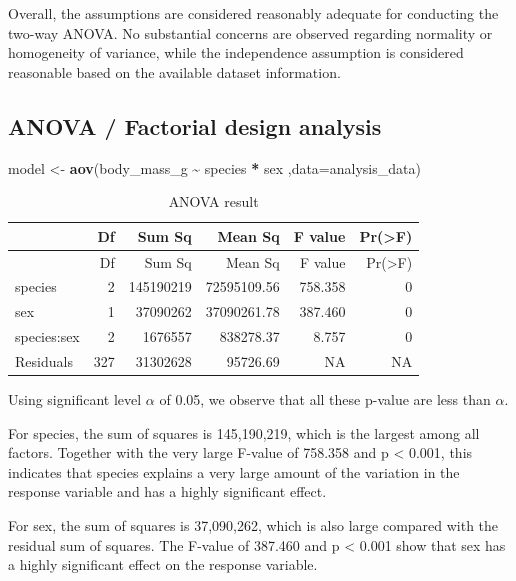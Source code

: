 \documentclass[
  11pt,
]{article}
\newenvironment{Shaded}{\begin{snugshade}}{\end{snugshade}}
\newcommand{\AttributeTok}[1]{\textcolor[rgb]{0.13,0.29,0.53}{#1}}
\newcommand{\FunctionTok}[1]{\textcolor[rgb]{0.13,0.29,0.53}{\textbf{#1}}}
\newcommand{\NormalTok}[1]{#1}
\newcommand{\OtherTok}[1]{\textcolor[rgb]{0.56,0.35,0.01}{#1}}
\newcommand{\SpecialCharTok}[1]{\textcolor[rgb]{0.81,0.36,0.00}{\textbf{#1}}}
\begin{document}
Overall, the assumptions are considered reasonably adequate for
conducting the two-way ANOVA. No substantial concerns are observed
regarding normality or homogeneity of variance, while the independence
assumption is considered reasonable based on the available dataset
information.

\subsection{ANOVA / Factorial design
analysis}\label{anova-factorial-design-analysis}

\begin{Shaded}
\begin{Highlighting}[]
\NormalTok{model }\OtherTok{\textless{}{-}} \FunctionTok{aov}\NormalTok{(body\_mass\_g }\SpecialCharTok{\textasciitilde{}}\NormalTok{ species }\SpecialCharTok{*}\NormalTok{ sex ,}\AttributeTok{data=}\NormalTok{analysis\_data)}
\end{Highlighting}
\end{Shaded}

\begin{longtable}[]{@{}lrrrrr@{}}
\caption{ANOVA result}\tabularnewline
\toprule\noalign{}
& Df & Sum Sq & Mean Sq & F value & Pr(\textgreater F) \\
\midrule\noalign{}
\endfirsthead
\toprule\noalign{}
& Df & Sum Sq & Mean Sq & F value & Pr(\textgreater F) \\
\midrule\noalign{}
\endhead
\bottomrule\noalign{}
\endlastfoot
species & 2 & 145190219 & 72595109.56 & 758.358 & 0 \\
sex & 1 & 37090262 & 37090261.78 & 387.460 & 0 \\
species:sex & 2 & 1676557 & 838278.37 & 8.757 & 0 \\
Residuals & 327 & 31302628 & 95726.69 & NA & NA \\
\end{longtable}

Using significant level \(\alpha\) of 0.05, we observe that all these
p-value are less than \(\alpha\).

For species, the sum of squares is 145,190,219, which is the largest
among all factors. Together with the very large F-value of 758.358 and p
\textless{} 0.001, this indicates that species explains a very large
amount of the variation in the response variable and has a highly
significant effect.

For sex, the sum of squares is 37,090,262, which is also large compared
with the residual sum of squares. The F-value of 387.460 and p
\textless{} 0.001 show that sex has a highly significant effect on the
response variable.
\end{document}
